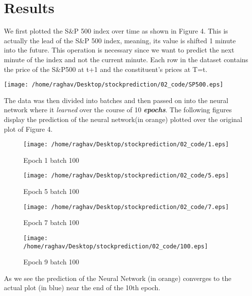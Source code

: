 \documentclass[12pt]{report}
\begin{document}
\section{Results}
We first plotted the S$\&$P 500 index over time as shown in Figure 4.
This is actually the lead of the S$\&$P 500 index, meaning, its value is shifted 1 minute into the future. This operation is necessary since we want to predict the next minute of the index and not the current minute. Each row in the dataset contains the price of the S$\&$P500 at t+1 and the constituent’s prices at T=t.
\begin{adjustbox}{center,caption={First 5 rows and 6 columns of the dataset},label={somelabel},nofloat=figure,vspace=\bigskipamount}
\texttt{[image: /home/raghav/Desktop/stockprediction/02\_code/SP500.eps]}%
\end{adjustbox}
The data was then divided into batches and then passed on into the neural network where it \textit{learned} over the course of 10 \textbf{\textit{epochs}}. The following figures display the prediction of the neural network(in orange) plotted over the original plot of Figure 4.
\begin{figure}[!htb]
   \begin{minipage}{0.48\textwidth}
     \centering
     \texttt{[image: /home/raghav/Desktop/stockprediction/02\_code/1.eps]}
     \caption{Epoch 1 batch 100}\label{Fig:Data1}
   \end{minipage}\hfill
   \begin{minipage}{0.48\textwidth}
     \centering
     \texttt{[image: /home/raghav/Desktop/stockprediction/02\_code/5.eps]}
     \caption{Epoch 5 batch 100}\label{Fig:Data2}
   \end{minipage}
\end{figure}

\begin{figure}[!htb]
	\begin{minipage}{0.48\textwidth}
     \centering
     \texttt{[image: /home/raghav/Desktop/stockprediction/02\_code/7.eps]}
     \caption{Epoch 7 batch 100}\label{Fig:Data2}
   \end{minipage}
   \begin{minipage}{0.48\textwidth}
     \centering
     \texttt{[image: /home/raghav/Desktop/stockprediction/02\_code/100.eps]}
     \caption{Epoch 9 batch 100}\label{Fig:Data1}
   \end{minipage}\hfill
   
\end{figure}
As we see the prediction of the Neural Network (in orange) converges to the actual plot (in blue) near the end of the 10th epoch.
\newpage
\end{document}
